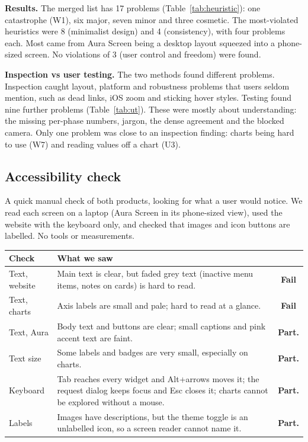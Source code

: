 \documentclass[10pt,a4paper,twocolumn]{article}
\newcommand{\fail}{\textcolor{red!70!black}{\textbf{Fail}}}
\newcommand{\partres}{\textcolor{orange!80!black}{\textbf{Part.}}}
\begin{document}
\textbf{Results.} The merged list has 17 problems (Table~\ref{tab:heuristic}): one
catastrophe (W1), six major, seven minor and three cosmetic. The most-violated
heuristics were 8 (minimalist design) and 4 (consistency), with four problems each.
Most came from Aura Screen being a desktop layout squeezed into a phone-sized
screen. No violations of 3
(user control and freedom) were found.

\textbf{Inspection vs user testing.} The two methods found different problems.
Inspection caught layout, platform and robustness problems that users seldom
mention, such as dead links, iOS zoom and sticking hover styles. Testing found nine
further problems (Table~\ref{tab:ut}). These were mostly about understanding: the
missing per-phase numbers, jargon, the dense agreement and the blocked camera. Only
one problem was close to an inspection finding: charts being hard to use (W7) and
reading values off a chart (U3).

\subsection{Accessibility check}
A quick manual check of both products, looking for what a user would notice. We
read each screen on a laptop (Aura Screen in its phone-sized view), used the
website with the keyboard only,
and checked that images and icon buttons are labelled. No tools or measurements.

\begin{center}\small
\begin{tabularx}{\columnwidth}{@{}lXc@{}}
\toprule
Check & What we saw & \\
\midrule
Text, website & Main text is clear, but faded grey text (inactive menu
  items, notes on cards) is hard to read. & \fail \\
Text, charts & Axis labels are small and pale; hard to read at a glance. &
  \fail \\
Text, Aura & Body text and buttons are clear; small captions and pink accent
  text are faint. & \partres \\
Text size & Some labels and badges are very small, especially on charts. & \partres \\
Keyboard & Tab reaches every widget and Alt+arrows moves it; the request dialog
  keeps focus and Esc closes it; charts cannot be explored without a mouse. &
  \partres \\
Labels & Images have descriptions, but the theme toggle is an unlabelled icon, so a
  screen reader cannot name it. & \partres \\
\bottomrule
\end{tabularx}
\end{center}
\end{document}
